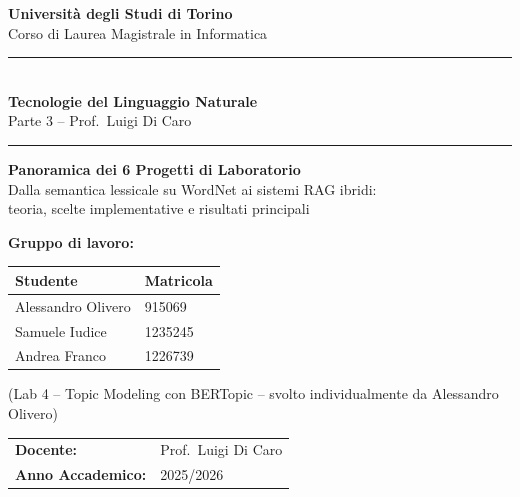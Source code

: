\documentclass[11pt,a4paper]{article}
\newcommand{\HRule}{\rule{\linewidth}{0.5mm}}
\begin{document}
\raggedbottom

\begin{titlepage}
  \centering
  \vspace*{1.5cm}

  {\Large\textbf{Università degli Studi di Torino}\\[0.3em]
  Corso di Laurea Magistrale in Informatica}

  \vspace{1cm}
  \HRule\\[0.4em]
  {\LARGE\textbf{Tecnologie del Linguaggio Naturale}}\\[0.3em]
  {\large Parte 3 -- Prof.\ Luigi Di Caro}\\[0.2em]
  \HRule

  \vspace{1.2cm}
  {\huge\textbf{Panoramica dei 6 Progetti di Laboratorio}}\\[0.6em]
  {\large Dalla semantica lessicale su WordNet ai sistemi RAG ibridi:\\
  teoria, scelte implementative e risultati principali}

  \vspace{2cm}

  {\large\textbf{Gruppo di lavoro:}}\\[0.8em]
  \begin{tabular}{ll}
    \toprule
    \textbf{Studente}    & \textbf{Matricola} \\
    \midrule
    Alessandro Olivero   & 915069  \\
    Samuele Iudice       & 1235245 \\
    Andrea Franco        & 1226739 \\
    \bottomrule
  \end{tabular}

  \vspace{0.6cm}
  {\small (Lab 4 -- Topic Modeling con BERTopic -- svolto individualmente da Alessandro Olivero)}

  \vspace{1.5cm}
  \begin{tabular}{ll}
    \textbf{Docente:}          & Prof.\ Luigi Di Caro \\[0.3em]
    \textbf{Anno Accademico:}  & 2025/2026 \\
  \end{tabular}

  \vfill
\end{titlepage}
\end{document}
